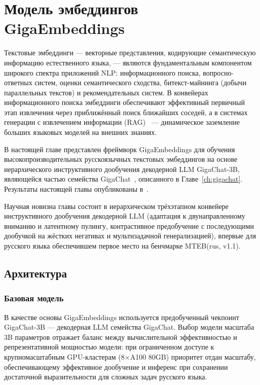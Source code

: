 \chapter{Модель эмбеддингов GigaEmbeddings}\label{ch:gigaembeddings}

Текстовые эмбеддинги --- векторные представления, кодирующие семантическую информацию естественного языка, --- являются фундаментальным компонентом широкого спектра приложений NLP: информационного поиска, вопросно-ответных систем, оценки семантического сходства, битекст-майнинга (добычи параллельных текстов) и рекомендательных систем. В конвейерах информационного поиска эмбеддинги обеспечивают эффективный первичный этап извлечения через приближённый поиск ближайших соседей, а в системах генерации с извлечением информации (RAG)~\cite{2005.11401} --- динамическое заземление больших языковых моделей на внешних знаниях.

В настоящей главе представлен фреймворк GigaEmbeddings для обучения высокопроизводительных русскоязычных текстовых эмбеддингов на основе иерархического инструктивного дообучения декодерной LLM GigaChat-3B, являющейся частью семейства GigaChat~\cite{2506.09440}, описанного в Главе~\ref{ch:gigachat}. Результаты настоящей главы опубликованы в~\cite{2510.22369}.

Научная новизна главы состоит в иерархическом трёхэтапном конвейере инструктивного дообучения декодерной LLM (адаптация к двунаправленному вниманию и латентному пулингу, контрастивное предобучение с последующими дообучкой на жёстких негативах и мультизадачной генерализацией), впервые для русского языка обеспечившем первое место на бенчмарке MTEB(rus, v1.1).

\section{Архитектура}\label{sec:ge_architecture}

\subsection{Базовая модель}\label{subsec:ge_backbone}

В качестве основы GigaEmbeddings используется предобученный чекпоинт GigaChat-3B --- декодерная LLM семейства GigaChat. Выбор модели масштаба 3B параметров отражает баланс между вычислительной эффективностью и репрезентативной мощностью модели: при ограниченном доступе к крупномасштабным GPU-кластерам (8$\times$A100 80GB) приоритет отдан масштабу, обеспечивающему эффективное дообучение и инференс при сохранении достаточной выразительности для сложных задач русского языка.

